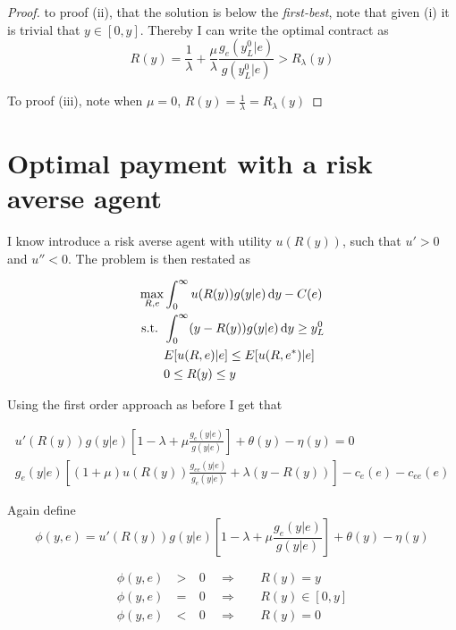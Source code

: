 \begin{proof}
to proof (ii), that the solution is below the \emph{first-best}, note that given (i) it is trivial that $y\in[0,y]$. Thereby I can write the optimal contract as 
\[
    R(y)=\frac{1}{\lambda}+\frac{\mu}{\lambda}\frac{g_e(y_L^0|e)}{g(y_L^0|e)}>R_\lambda(y)
\]

To proof (iii), note when $\mu=0$, $R(y)=\frac{1}{\lambda}=R_\lambda(y)$
\end{proof}
\section{Optimal payment with a risk averse agent} %
\label{sec:optimal_payment_with_a_risk_averse_agent}
I know introduce a risk averse agent with utility $u(R(y))$, such that $u'>0$ and $u''<0$. The problem is then restated as 

\begin{subequations}
\label{eq:khun-tucker-ra}
\begin{align}
    \max_{R,e} & \int_0^{\infty}u(R(y))g(y|e)\dif y-C(e)\label{subeq:khun-tucker-ra1} \\
    \text{s.t. }    & \int_{0}^{\infty} (y-R(y))g(y|e)\dif y\geq y_L^0 \label{subeq:khun-tucker-ra2} \\
                    & E[u(R,e)|e]\leq E[u(R,e^*)|e] \label{subeq:khun-tucker-ra3}\\
                    & 0\leq R(y)\leq y \label{subeq:khun-tucker-ra4}
\end{align}
\end{subequations}

Using the first order approach as before I get that 

\begin{subequations}
\label{eq:lagrange-ra}
\begin{align}
    u'(R(y))g(y|e)\left[1-\lambda+\mu \frac{g_e(y|e)}{g(y|e)}\right] + \theta(y)-\eta(y)=0 \\
    g_e(y|e)\left[(1+\mu)u(R(y))\frac{g_{ee}(y|e)}{g_e(y|e)}+\lambda(y-R(y))\right]-c_e(e)-c_{ee}(e)
\end{align}
\end{subequations}

Again define 
\[
    \phi(y,e) = u'(R(y))g(y|e)\left[1-\lambda+\mu \frac{g_e(y|e)}{g(y|e)}\right]  + \theta(y)-\eta(y)
\]

\begin{subequations}
\label{eq:KT-analysis-ra}
\begin{alignat}{3}
    \phi(y,e) & \: > \: & 0 & \enspace \Rightarrow & & \enspace R(y)=y \label{subeq:large-y-ra}\\
    \phi(y,e) & \: = \: & 0 & \enspace \Rightarrow & & \enspace R(y)\in [0,y] \label{subeq:interval-y-ra} \\
    \phi(y,e) & \: < \: & 0 & \enspace \Rightarrow & & \enspace R(y) =0 \label{subeq:small-y-ra}
\end{alignat}
\end{subequations}


